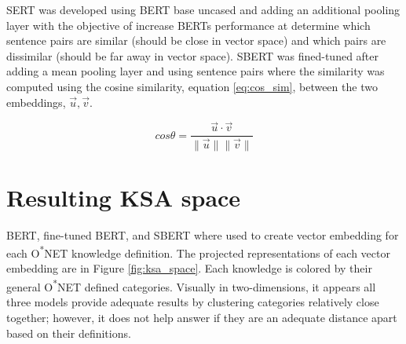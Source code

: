 \documentclass[12pt]{article}
\begin{document}
SERT was developed using BERT base uncased and adding an additional pooling layer with the objective of increase BERTs performance at determine which sentence pairs are similar (should be close in vector space) and which pairs are dissimilar (should be far away in vector space).\cite{sbert} SBERT was fined-tuned after adding a mean pooling layer and using sentence pairs where the similarity was computed using the cosine similarity, equation \ref{eq:cos_sim}, between the two embeddings, $\vec{u},\vec{v}$.\cite{sbert}

\begin{equation}
    cos\theta = \frac{\vec{u} \cdot \vec{v}}{\|\vec{u}\|\|\vec{v}\|}
    \label{eq:cos_sim}
\end{equation}

\section{Resulting KSA space}

BERT, fine-tuned BERT, and SBERT where used to create vector embedding for each O\textsuperscript{*}NET knowledge definition. The projected representations of each vector embedding are in Figure \ref{fig:ksa_space}. Each knowledge is colored by their general O\textsuperscript{*}NET defined categories. Visually  in two-dimensions, it appears all three models provide adequate results by clustering categories relatively close together; however, it does not help answer if they are an adequate distance apart based on their definitions.
\end{document}

